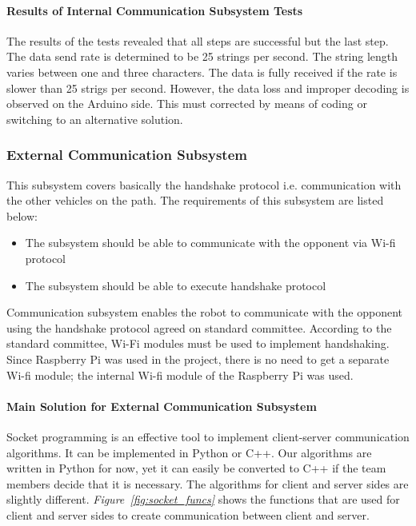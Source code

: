 \documentclass[a4paper,12pt]{article}
\begin{document}
	\paragraph{Results of Internal Communication Subsystem Tests}
	The results of the tests revealed that all steps are successful but the last step. The data send rate is determined to be 25 strings per second. The string length varies between one and three characters. The data is fully received if the rate is slower than 25 strigs per second. However, the data loss  and  improper decoding is observed on the Arduino side. This must corrected by means of coding or switching to an alternative solution.
	
	\subsubsection{External Communication Subsystem}
	
	This subsystem covers basically the handshake protocol i.e. communication with the other vehicles on the path. The requirements of this subsystem are listed below:
	\begin{itemize}
		\item The subsystem should be able to communicate with the opponent via Wi-fi protocol
		\item The subsystem should be able to execute handshake protocol
	\end{itemize}
	
	Communication subsystem enables the robot to communicate with the opponent using the handshake protocol agreed on standard committee. According to the standard committee, Wi-Fi modules must be used to implement handshaking. Since Raspberry Pi was used in the project, there is no need to get a separate Wi-fi module; the internal Wi-fi module of the Raspberry Pi was used.
	
	\paragraph{Main Solution for External Communication Subsystem}
	
	Socket programming is an effective tool to implement client-server communication algorithms. It can be implemented in Python or C++.  Our algorithms are written in Python for now, yet it can easily be converted to C++ if the team members decide that it is necessary. The algorithms for client and server sides are slightly different. \textit{Figure~\ref{fig:socket_funcs}} shows the functions that are used for client and server sides to create communication between client and server.
	
\end{document}
